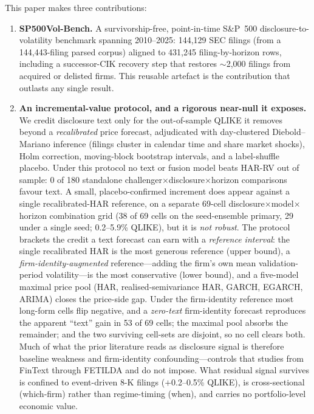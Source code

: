 This paper makes three contributions:
\begin{enumerate}
  \item \textbf{SP500Vol-Bench.} A survivorship-free, point-in-time S\&P~500 disclosure-to-volatility benchmark spanning 2010--2025: 144{,}129 SEC filings (from a 144{,}443-filing parsed corpus) aligned to 431{,}245 filing-by-horizon rows, including a successor-CIK recovery step that restores $\sim$2{,}000 filings from acquired or delisted firms. This reusable artefact is the contribution that outlasts any single result.
  \item \textbf{An incremental-value protocol, and a rigorous near-null it exposes.} We credit disclosure text only for the out-of-sample QLIKE it removes beyond a \emph{recalibrated} price forecast, adjudicated with day-clustered Diebold--Mariano inference (filings cluster in calendar time and share market shocks), Holm correction, moving-block bootstrap intervals, and a label-shuffle placebo. Under this protocol no text or fusion model beats HAR-RV out of sample: 0 of 180 standalone challenger$\times$disclosure$\times$horizon comparisons favour text. A small, placebo-confirmed increment does appear against a single recalibrated-HAR reference, on a separate 69-cell disclosure$\times$model$\times$horizon combination grid (38 of 69 cells on the seed-ensemble primary, 29 under a single seed; 0.2--5.9\% QLIKE), but it is \emph{not robust}. The protocol brackets the credit a text forecast can earn with a \emph{reference interval}: the single recalibrated HAR is the most generous reference (upper bound), a \emph{firm-identity-augmented} reference---adding the firm's own mean validation-period volatility---is the most conservative (lower bound), and a five-model maximal price pool (HAR, realised-semivariance HAR, GARCH, EGARCH, ARIMA) closes the price-side gap. Under the firm-identity reference most long-form cells flip negative, and a \emph{zero-text} firm-identity forecast reproduces the apparent ``text'' gain in 53 of 69 cells; the maximal pool absorbs the remainder; and the two surviving cell-sets are disjoint, so no cell clears both. Much of what the prior literature reads as disclosure signal is therefore baseline weakness and firm-identity confounding---controls that studies from FinText through FETILDA and \citet{kogan2009predicting} do not impose. What residual signal survives is confined to event-driven 8-K filings ($+$0.2--0.5\% QLIKE), is cross-sectional (which-firm) rather than regime-timing (when), and carries no portfolio-level economic value.

\end{enumerate}
